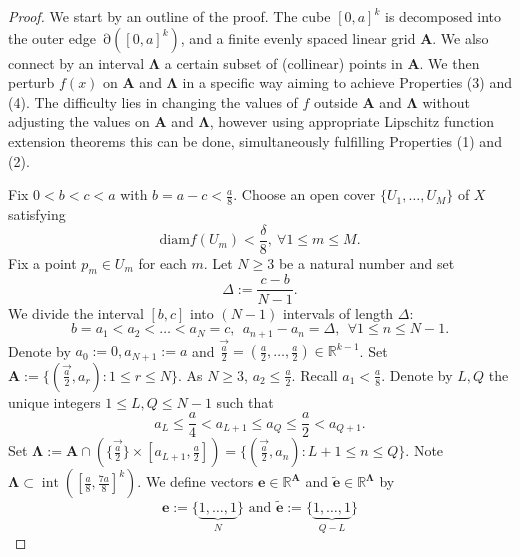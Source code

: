 \documentclass[11pt]{article}
\theoremstyle{plain}
\theoremstyle{definition}
\DeclareMathOperator{\Int}{int}
\DeclareMathOperator{\Edge}{\partial}
\def\R{\mathbb{R}}
\def\AA{\mathbf A}
\def\LL{\mathbf \Lambda}
\numberwithin{figure}{section}
\begin{document}
\begin{proof}
 We start by an outline of the proof. 
The cube $[0,a]^k$ is decomposed into the outer edge $\Edge([0,a]^k)$, and a finite evenly spaced linear grid $\AA$. We also connect by an interval $\LL$ a certain subset of (collinear) points in $\AA$.
 We then perturb $f(x)$ on $\AA$ and $\LL$ in  a specific way aiming  to achieve Properties (3) and (4).  The difficulty lies in changing the values of $f$ outside $\AA$ and $\LL$ without adjusting the values on $\AA$ and $\LL$, however using appropriate Lipschitz function extension theorems this can be done, simultaneously fulfilling Properties (1) and (2).   

    Fix $0<b<c<a$ with $b=a-c<\frac{a}{8}$. Choose an open cover $\{U_1,\ldots,U_M\}$ of $X$ satisfying
    \begin{equation}\label{cover}
        \text{diam}f(U_m)<\frac{\delta}{8},~\forall 1\leq m\leq M.
    \end{equation}
    Fix a point $p_m\in U_m$ for each $m$. Let $N\geq 3$ be a natural number and set
    \begin{equation*}
        \Delta:=\frac{c-b}{N-1}.
    \end{equation*}
 We divide the interval $[b,c]$ into $(N-1)$ intervals of length $\Delta$\label{notation_Delta}:
 \begin{equation*}\label{notation_a_n}
     b=a_1<a_2<\ldots<a_N=c,~~a_{n+1}-a_n=\Delta,  ~~\forall 1\leq n \leq N-1.
 \end{equation*}
 Denote by $a_0:=0, a_{N+1}:=a$ and
     $\vec{\frac{a}{2}}=(\frac{a}{2},\ldots, \frac{a}{2})\in \R^{k-1}$. Set $\mathbf{A}:=\{(\vec{\frac{a}{2}}, a_{r}): 1\leq r\leq N\}$. As $N\geq 3$, $a_2\leq \frac{a}{2}$. Recall $a_1< \frac{a}{8}$.
 Denote by $L,Q$ the unique integers $1\leq L,Q\leq N-1$ such that
 \begin{equation*}\label{notation_L,Q}
     a_L\leq \frac{a}{4}<a_{L+1}\leq a_Q\leq\frac{a}{2}<a_{Q+1}.
 \end{equation*}
Set $\LL:=\mathbf{A}\cap(\{\vec{\frac{a}{2}}\}\times[a_{L+1},\frac{a}{2}])=\{(\vec{\frac{a}{2}}, a_n): L+1\leq n\leq Q\}$.
 Note $\LL\subset \Int([\frac{a}{8}, \frac{7a}{8}]^k)$.
 We define vectors $\mathbf e\in\mathbb{R}^{\mathbf{A}}$ and $\widetilde{\mathbf e}\in\mathbb{R}^{\LL}$ by 
    \begin{equation*}\label{notation_e}
      \mathbf e:=\{\underbrace{1,\ldots,1}_{N}\} \text{ and } \widetilde{\mathbf e}:=\{\underbrace{1,\ldots,1}_{Q-L}\}
    \end{equation*}

\end{proof}
\end{document}
